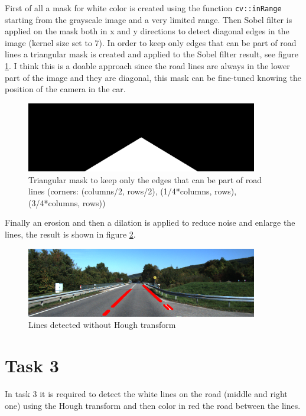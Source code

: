 \documentclass{article}
\begin{document}
First of all a mask for white color is created using the function \texttt{cv::inRange} starting from the grayscale image and a very limited range.
Then Sobel filter is applied on the mask both in x and y directions to detect diagonal edges in the image (kernel size set to 7).
In order to keep only edges that can be part of road lines a triangular mask is created and applied to the Sobel filter result, see figure \ref{fig:triangular_mask}. I think this is a doable approach since the road lines are always in the lower part of the image and they are diagonal, this mask can be fine-tuned knowing the position of the camera in the car.
\begin{figure}[h]
		\centering
		\includegraphics[width=0.9\textwidth]{centeringMask.png}
		\caption{Triangular mask to keep only the edges that can be part of road lines (corners: (columns/2, rows/2), (1/4*columns, rows), (3/4*columns, rows))}
		\label{fig:triangular_mask}
\end{figure}
Finally an erosion and then a dilation is applied to reduce noise and enlarge the lines, the result is shown in figure \ref{fig:lines_noHough}.


\begin{figure}[H]
		\centering
		\includegraphics[width=0.9\textwidth]{street_scene_LinesNoHough.png}
		\caption{Lines detected without Hough transform}
		\label{fig:lines_noHough}
\end{figure}


\section*{Task 3}
In task 3 it is required to detect the white lines on the road (middle and right one) using the Hough transform and then color in red the road between the lines.
\end{document}
